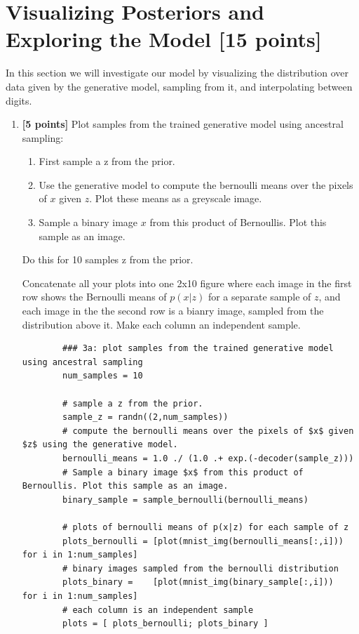 \documentclass{article}
\begin{document}
\pagebreak

\section{Visualizing Posteriors and Exploring the Model [15 points]}
In this section we will investigate our model by visualizing the distribution over data given by the generative model, sampling from it, and interpolating between digits.

\begin{enumerate}[label=(\alph*)]
	\item {\bf [5 points]} Plot samples from the trained generative model using ancestral sampling:	
	\begin{enumerate}[label=(\alph*)]

			\item First sample a z from the prior.
			\item Use the generative model to compute the bernoulli means over the pixels of $x$ given $z$. Plot these means as a greyscale image.
			\item Sample a binary image $x$ from this product of Bernoullis. Plot this sample as an image.
	\end{enumerate}
	Do this for 10 samples z from the prior.
	
	Concatenate all your plots into one 2x10 figure where each image in the first row shows the Bernoulli means of $p(x|z)$ for a separate sample of $z$, and each image in the the second row is a bianry image, sampled from the distribution above it.
	Make each column an independent sample.

	\begin{lstlisting}
		### 3a: plot samples from the trained generative model using ancestral sampling
		num_samples = 10
		
		# sample a z from the prior.
		sample_z = randn((2,num_samples))
		# compute the bernoulli means over the pixels of $x$ given $z$ using the generative model.
		bernoulli_means = 1.0 ./ (1.0 .+ exp.(-decoder(sample_z)))
		# Sample a binary image $x$ from this product of Bernoullis. Plot this sample as an image.
		binary_sample = sample_bernoulli(bernoulli_means)
		
		# plots of bernoulli means of p(x|z) for each sample of z
		plots_bernoulli = [plot(mnist_img(bernoulli_means[:,i]))  for i in 1:num_samples]
		# binary images sampled from the bernoulli distribution
		plots_binary =    [plot(mnist_img(binary_sample[:,i]))    for i in 1:num_samples]
		# each column is an independent sample
		plots = [ plots_bernoulli; plots_binary ]
		

\end{lstlisting}
\end{enumerate}
\end{document}
